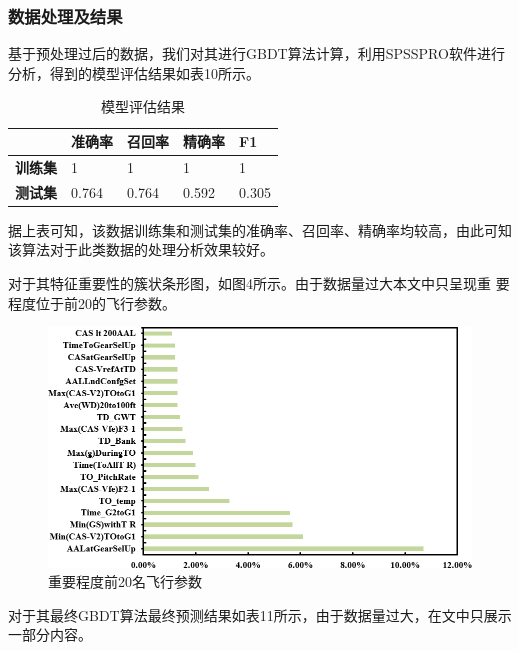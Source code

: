 \documentclass[UTF8]{ctexart}
\begin{document}
\subsubsection{数据处理及结果}
基于预处理过后的数据，我们对其进行GBDT算法计算，利用SPSSPRO软件进行分析，得到的模型评估结果如表10所示。\par
\begin{table}[!ht]
	\centering
	\caption{模型评估结果}
	\begin{tabular}{|l|l|l|l|l|}
		\hline
		\textbf{} & \textbf{准确率}  & \textbf{召回率}  & \textbf{精确率}  & \textbf{F1} \\ \hline
		\textbf{训练集} & 1 & 1 & 1 & 1 \\ \hline
		\textbf{测试集} & 0.764 & 0.764 & 0.592 & 0.305 \\ \hline
	\end{tabular}
\end{table}\par
据上表可知，该数据训练集和测试集的准确率、召回率、精确率均较高，由此可知该算法对于此类数据的处理分析效果较好。\par
对于其特征重要性的簇状条形图，如图4所示。由于数据量过大本文中只呈现重
要程度位于前20的飞行参数。\par
	\begin{figure}[h]
	\centering
	\includegraphics[scale=0.65]{重要程度前20名飞行参数.png}
	\caption{重要程度前20名飞行参数 }
\end{figure}\par
对于其最终GBDT算法最终预测结果如表11所示，由于数据量过大，在文中只展示一部分内容。\par
\end{document}
